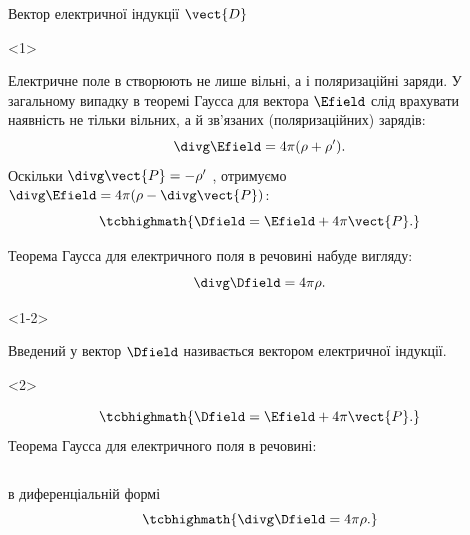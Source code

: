 \documentclass[]{beamer}
\begin{document}
\begin{frame}{Вектор електричної індукції $\vect{D}$}{}\small
	\begin{onlyenv}
		\begin{block}{}\justifying
			Електричне поле в створюють не лише вільні, а і поляризаційні заряди. У загальному випадку в
			теоремі Гаусса для вектора $\Efield$ слід врахувати наявність не тільки вільних, а й
			зв'язаних (поляризаційних) зарядів:
			\begin{equation*}
				\divg\Efield = 4\pi(\rho + \rho').
			\end{equation*}
			Оскільки $\divg\vect{P} = - \rho'$ , отримуємо $\divg\Efield = 4\pi(\rho -\divg\vect{P})$:
			\begin{equation*}
				\tcbhighmath{
					\Dfield = \Efield + 4\pi\vect{P}.
				}
			\end{equation*}
		\end{block}
		\begin{block}{}
			Теорема Гаусса для електричного поля в речовині набуде вигляду:
			\begin{equation*}
				\divg\Dfield = 4\pi\rho.
			\end{equation*}
		\end{block}
	\end{onlyenv}
	\begin{onlyenv}<1-2>
		\begin{block}{}
			Введений у вектор $\Dfield$ називається \alert{вектором електричної індукції}.
		\end{block}
	\end{onlyenv}
	\begin{onlyenv}
		\begin{block}{}
			\begin{equation*}
				\tcbhighmath{
					\Dfield = \Efield + 4\pi\vect{P}.
				}
			\end{equation*}
			Теорема Гаусса для електричного поля в речовині:
		\end{block}
		\begin{columns}
			\begin{column}{0.5\linewidth}
				\begin{block}{}\centering
					в диференціальній формі
					\begin{equation*}
						\tcbhighmath{\divg\Dfield = 4\pi\rho.}
					\end{equation*}
				\end{block}
			\end{column}

\end{columns}
\end{onlyenv}
\end{frame}
\end{document}
